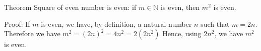 Theorem Square of even number is even: 
if $m \in \mathbb{N}$ is even, then $m^2$ is even.


Proof:
If $m$ is even, we have, by definition, a natural number $n$ such that $m = 2n$.
Therefore we have $m^2 = (2n)^2 = 4n^2 = 2(2n^2)$
Hence, using $2n^2$, we have $m^2$ is even.